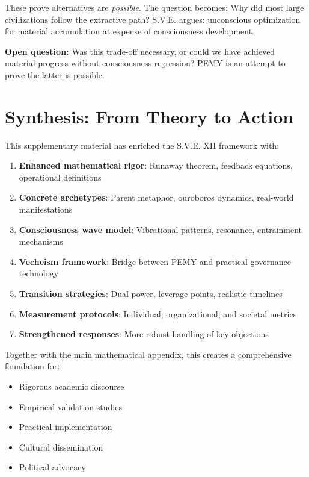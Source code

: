\documentclass[11pt,a4paper]{article}
\theoremstyle{definition}
\theoremstyle{remark}
\begin{document}
These prove alternatives are \textit{possible}. The question becomes: Why did most large civilizations follow the extractive path? S.V.E. argues: unconscious optimization for material accumulation at expense of consciousness development.

\textbf{Open question:} Was this trade-off necessary, or could we have achieved material progress without consciousness regression? PEMY is an attempt to prove the latter is possible.

\section{Synthesis: From Theory to Action}

This supplementary material has enriched the S.V.E. XII framework with:

\begin{enumerate}[leftmargin=1.5em]
    \item \textbf{Enhanced mathematical rigor}: Runaway theorem, feedback equations, operational definitions
    \item \textbf{Concrete archetypes}: Parent metaphor, ouroboros dynamics, real-world manifestations
    \item \textbf{Consciousness wave model}: Vibrational patterns, resonance, entrainment mechanisms
    \item \textbf{Vecheism framework}: Bridge between PEMY and practical governance technology
    \item \textbf{Transition strategies}: Dual power, leverage points, realistic timelines
    \item \textbf{Measurement protocols}: Individual, organizational, and societal metrics
    \item \textbf{Strengthened responses}: More robust handling of key objections
\end{enumerate}

Together with the main mathematical appendix, this creates a comprehensive foundation for:
\begin{itemize}[leftmargin=1.5em]
    \item Rigorous academic discourse
    \item Empirical validation studies
    \item Practical implementation
    \item Cultural dissemination
    \item Political advocacy
\end{itemize}
\end{document}
